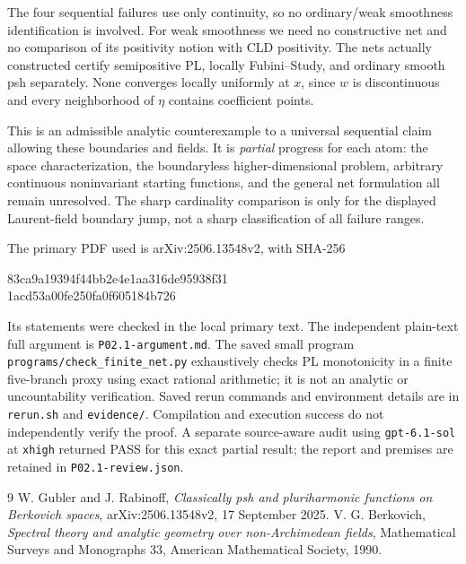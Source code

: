 \documentclass[11pt]{article}
\begin{document}
The four sequential failures use only continuity, so no ordinary/weak
smoothness identification is involved. For weak smoothness we need no
constructive net and no comparison of its positivity notion with CLD
positivity. The nets actually constructed certify semipositive PL,
locally Fubini--Study, and ordinary smooth psh separately. None converges
locally uniformly at $x$, since $w$ is discontinuous and every
neighborhood of $\eta$ contains coefficient points.

This is an admissible analytic counterexample to a universal sequential
claim allowing these boundaries and fields. It is \emph{partial}
progress for each atom: the space characterization, the boundaryless
higher-dimensional problem, arbitrary continuous noninvariant starting
functions, and the general net formulation all remain unresolved.
The sharp cardinality comparison is only for the displayed Laurent-field
boundary jump, not a sharp classification of all failure ranges.

The primary PDF used is arXiv:2506.13548v2, with SHA-256
\begin{center}\small\ttfamily
83ca9a19394f44bb2e4e1aa316de95938f31\\
1acd53a00fe250fa0f605184b726
\end{center}
Its statements were checked in the local primary text. The independent
plain-text full argument is \texttt{P02.1-argument.md}. The saved small
program \texttt{programs/check\_finite\_net.py} exhaustively checks PL
monotonicity in a finite five-branch proxy using exact rational arithmetic;
it is not an analytic or uncountability verification. Saved rerun commands
and environment details are in \texttt{rerun.sh} and \texttt{evidence/}.
Compilation and execution success do not independently verify the proof.
A separate source-aware audit using \texttt{gpt-6.1-sol} at
\texttt{xhigh} returned PASS for this exact partial result; the report
and premises are retained in \texttt{P02.1-review.json}.

\begin{thebibliography}{9}
 W. Gubler and J. Rabinoff,
\emph{Classically psh and pluriharmonic functions on Berkovich spaces},
arXiv:2506.13548v2, 17 September 2025.
 V. G. Berkovich,
\emph{Spectral theory and analytic geometry over non-Archimedean fields},
Mathematical Surveys and Monographs 33, American Mathematical Society,
1990.
\end{thebibliography}
\end{document}
